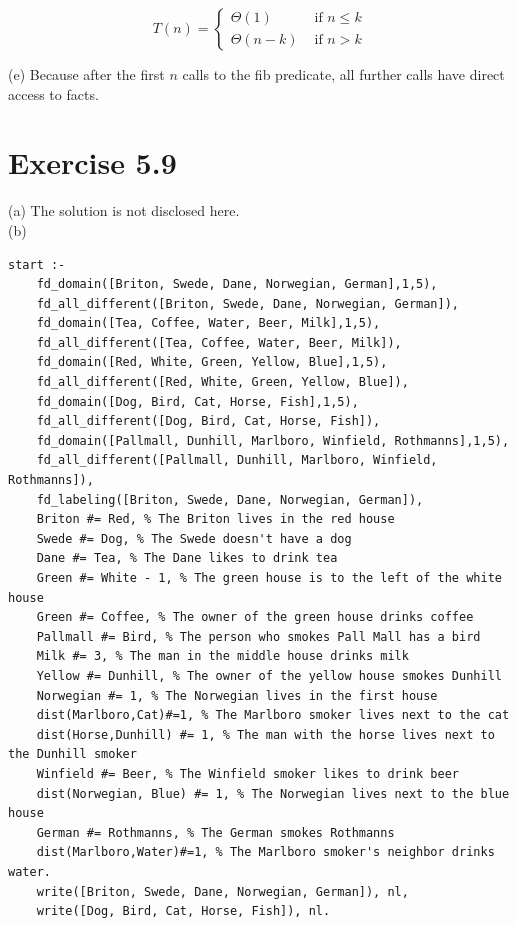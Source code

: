 \documentclass[10pt]{article}
\begin{document}
$$
T(n)= \begin{cases}\Theta(1) & \text { if } n \leq k \\ \Theta(n-k) & \text { if } n>k\end{cases}
$$

(e) Because after the first $n$ calls to the fib predicate, all further calls have direct access to facts.

\section*{Exercise 5.9}
(a) The solution is not disclosed here.\\
(b)

\begin{verbatim}
start :-
    fd_domain([Briton, Swede, Dane, Norwegian, German],1,5),
    fd_all_different([Briton, Swede, Dane, Norwegian, German]),
    fd_domain([Tea, Coffee, Water, Beer, Milk],1,5),
    fd_all_different([Tea, Coffee, Water, Beer, Milk]),
    fd_domain([Red, White, Green, Yellow, Blue],1,5),
    fd_all_different([Red, White, Green, Yellow, Blue]),
    fd_domain([Dog, Bird, Cat, Horse, Fish],1,5),
    fd_all_different([Dog, Bird, Cat, Horse, Fish]),
    fd_domain([Pallmall, Dunhill, Marlboro, Winfield, Rothmanns],1,5),
    fd_all_different([Pallmall, Dunhill, Marlboro, Winfield, Rothmanns]),
    fd_labeling([Briton, Swede, Dane, Norwegian, German]),
    Briton #= Red, % The Briton lives in the red house
    Swede #= Dog, % The Swede doesn't have a dog
    Dane #= Tea, % The Dane likes to drink tea
    Green #= White - 1, % The green house is to the left of the white house
    Green #= Coffee, % The owner of the green house drinks coffee
    Pallmall #= Bird, % The person who smokes Pall Mall has a bird
    Milk #= 3, % The man in the middle house drinks milk
    Yellow #= Dunhill, % The owner of the yellow house smokes Dunhill
    Norwegian #= 1, % The Norwegian lives in the first house
    dist(Marlboro,Cat)#=1, % The Marlboro smoker lives next to the cat
    dist(Horse,Dunhill) #= 1, % The man with the horse lives next to the Dunhill smoker
    Winfield #= Beer, % The Winfield smoker likes to drink beer
    dist(Norwegian, Blue) #= 1, % The Norwegian lives next to the blue house
    German #= Rothmanns, % The German smokes Rothmanns
    dist(Marlboro,Water)#=1, % The Marlboro smoker's neighbor drinks water.
    write([Briton, Swede, Dane, Norwegian, German]), nl,
    write([Dog, Bird, Cat, Horse, Fish]), nl.
\end{verbatim}
\end{document}

